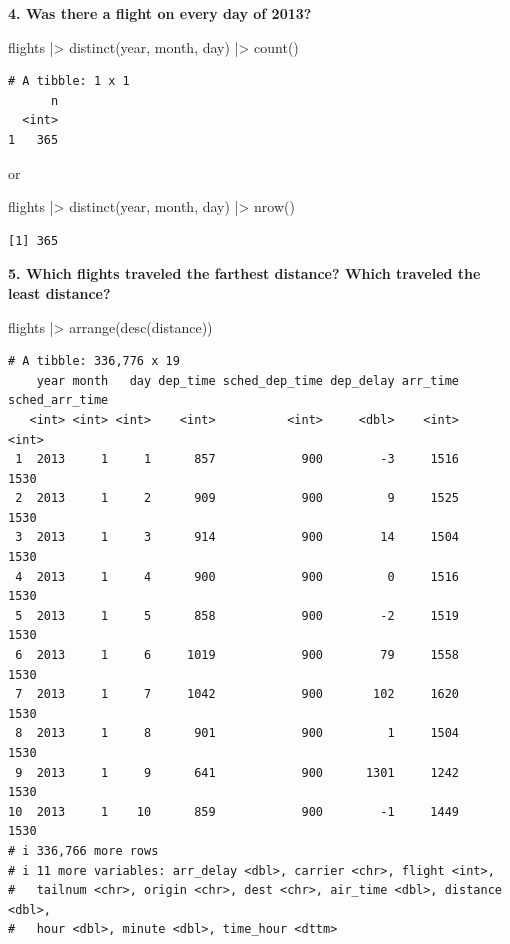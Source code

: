 \documentclass[
  letterpaper,
  DIV=11,
  numbers=noendperiod]{scrreprt}
\newenvironment{Shaded}{\begin{snugshade}}{\end{snugshade}}
\newcommand{\FunctionTok}[1]{\textcolor[rgb]{0.28,0.35,0.67}{#1}}
\newcommand{\NormalTok}[1]{\textcolor[rgb]{0.00,0.23,0.31}{#1}}
\newcommand{\SpecialCharTok}[1]{\textcolor[rgb]{0.37,0.37,0.37}{#1}}
\begin{document}
\textbf{4. Was there a flight on every day of 2013?}

\begin{Shaded}
\begin{Highlighting}[]
\NormalTok{flights }\SpecialCharTok{|\textgreater{}}
  \FunctionTok{distinct}\NormalTok{(year, month, day) }\SpecialCharTok{|\textgreater{}}
  \FunctionTok{count}\NormalTok{()}
\end{Highlighting}
\end{Shaded}

\begin{verbatim}
# A tibble: 1 x 1
      n
  <int>
1   365
\end{verbatim}

or

\begin{Shaded}
\begin{Highlighting}[]
\NormalTok{flights }\SpecialCharTok{|\textgreater{}}
  \FunctionTok{distinct}\NormalTok{(year, month, day) }\SpecialCharTok{|\textgreater{}}
  \FunctionTok{nrow}\NormalTok{()}
\end{Highlighting}
\end{Shaded}

\begin{verbatim}
[1] 365
\end{verbatim}

\textbf{5. Which flights traveled the farthest distance? Which traveled
the least distance?}

\begin{Shaded}
\begin{Highlighting}[]
\NormalTok{flights }\SpecialCharTok{|\textgreater{}}
  \FunctionTok{arrange}\NormalTok{(}\FunctionTok{desc}\NormalTok{(distance))}
\end{Highlighting}
\end{Shaded}

\begin{verbatim}
# A tibble: 336,776 x 19
    year month   day dep_time sched_dep_time dep_delay arr_time sched_arr_time
   <int> <int> <int>    <int>          <int>     <dbl>    <int>          <int>
 1  2013     1     1      857            900        -3     1516           1530
 2  2013     1     2      909            900         9     1525           1530
 3  2013     1     3      914            900        14     1504           1530
 4  2013     1     4      900            900         0     1516           1530
 5  2013     1     5      858            900        -2     1519           1530
 6  2013     1     6     1019            900        79     1558           1530
 7  2013     1     7     1042            900       102     1620           1530
 8  2013     1     8      901            900         1     1504           1530
 9  2013     1     9      641            900      1301     1242           1530
10  2013     1    10      859            900        -1     1449           1530
# i 336,766 more rows
# i 11 more variables: arr_delay <dbl>, carrier <chr>, flight <int>,
#   tailnum <chr>, origin <chr>, dest <chr>, air_time <dbl>, distance <dbl>,
#   hour <dbl>, minute <dbl>, time_hour <dttm>
\end{verbatim}
\end{document}
